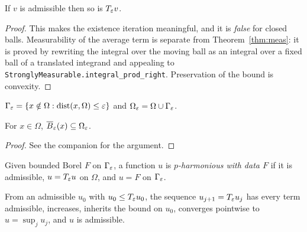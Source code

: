 \begin{theorem}\label{thm:invariance}
\leanok
If $v$ is admissible then so is $T_\varepsilon v$.
\end{theorem}

\begin{proof}
\leanok
{}
This makes the existence iteration meaningful, and it is \emph{false} for
closed balls. Measurability of the average term is separate from
Theorem~\ref{thm:meas}: it is proved by rewriting the integral over the moving
ball as an integral over a fixed ball of a translated integrand and appealing
to \texttt{StronglyMeasurable.integral\_prod\_right}. Preservation of the
bound is convexity.
\end{proof}


\begin{definition}\label{def:strip}
\leanok
$\Gamma_\varepsilon = \{x \notin \Omega : \operatorname{dist}(x,\Omega) \le \varepsilon\}$
and $\Omega_\varepsilon = \Omega \cup \Gamma_\varepsilon$.
\end{definition}


\begin{lemma}\label{lem:closed}
\leanok
{}
For $x \in \Omega$, $\overline{B}_\varepsilon(x) \subseteq \Omega_\varepsilon$.
\end{lemma}

\begin{proof}
\leanok
See the companion for the argument.
\end{proof}


\begin{definition}\label{def:pharm}
\leanok
{}
Given bounded Borel $F$ on $\Gamma_\varepsilon$, a function $u$ is
\emph{$p$-harmonious with data $F$} if it is admissible, $u = T_\varepsilon u$ on
$\Omega$, and $u = F$ on $\Gamma_\varepsilon$.
\end{definition}


\begin{theorem}\label{thm:iteration}
\leanok
From an admissible $u_0$ with $u_0 \le T_\varepsilon u_0$, the sequence
$u_{j+1} = T_\varepsilon u_j$ has every term admissible, increases, inherits the bound on
$u_0$, converges pointwise to $u = \sup_j u_j$, and $u$ is admissible.
\end{theorem}

